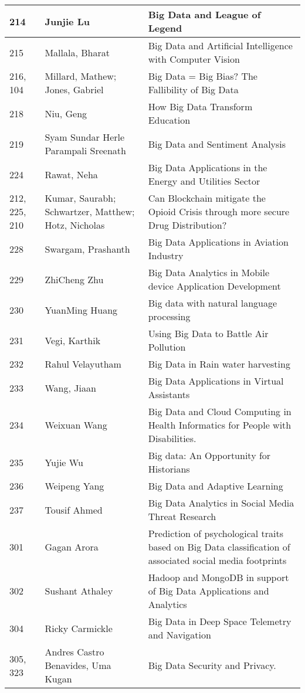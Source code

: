 \documentclass[12pt]{book}
\begin{document}
\begin{footnotesize}
\begin{longtable}{|p{1cm}p{5cm}p{9cm}|}
\hline
214 & Junjie Lu & Big Data and League of Legend  \\
\hline
215 & Mallala, Bharat & Big Data and Artificial Intelligence with Computer Vision  \\
\hline
216, 104 & Millard, Mathew; Jones, Gabriel & Big Data = Big Bias? The Fallibility of Big Data  \\
\hline
218 & Niu, Geng & How Big Data Transform Education  \\
\hline
219 & Syam Sundar Herle Parampali Sreenath & Big Data and Sentiment Analysis  \\
\hline
224 & Rawat, Neha & Big Data Applications in the Energy and Utilities Sector  \\
\hline
212, 225, 210 & Kumar, Saurabh; Schwartzer, Matthew; Hotz, Nicholas & Can Blockchain mitigate the Opioid Crisis through more secure Drug Distribution?  \\
\hline
228 & Swargam, Prashanth & Big Data Applications in Aviation Industry  \\
\hline
229 & ZhiCheng Zhu & Big Data Analytics in Mobile device Application Development  \\
\hline
230 & YuanMing Huang & Big data with natural language processing  \\
\hline
231 & Vegi, Karthik & Using Big Data to Battle Air Pollution  \\
\hline
232 & Rahul Velayutham & Big Data in Rain water harvesting  \\
\hline
233 & Wang, Jiaan & Big Data Applications in Virtual Assistants  \\
\hline
234 & Weixuan Wang & Big Data and Cloud Computing in Health Informatics for People with Disabilities.  \\
\hline
235 & Yujie Wu & Big data: An Opportunity for Historians  \\
\hline
236 & Weipeng Yang & Big Data and Adaptive Learning  \\
\hline
237 & Tousif Ahmed & Big Data Analytics in Social Media Threat Research  \\
\hline
301 & Gagan Arora & Prediction of psychological traits based on Big Data classification of associated social media footprints  \\
\hline
302 & Sushant Athaley & Hadoop and MongoDB in support of Big Data Applications and Analytics  \\
\hline
304 & Ricky Carmickle & Big Data in Deep Space Telemetry and Navigation  \\
\hline
305, 323 & Andres Castro Benavides, Uma Kugan & Big Data Security and Privacy.  \\

\end{longtable}
\end{footnotesize}
\end{document}
